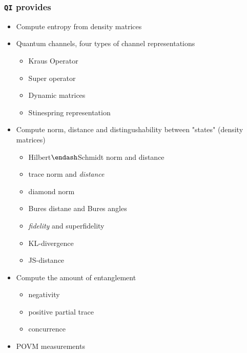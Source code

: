 \documentclass[11pt,a4paper]{article}
\begin{document}
\subsubsection{\texttt{QI} provides}
\begin{itemize}
\item Compute entropy from density matrices


\item Quantum channels, four types of channel representations

\begin{itemize}
\item Kraus Operator


\item Super operator


\item Dynamic matrices


\item Stinespring representation

\end{itemize}

\item Compute norm, distance and distingushability between "states" (density matrices)

\begin{itemize}
\item Hilbert\ensuremath{\endash}Schmidt norm and distance


\item trace norm and \emph{distance}


\item diamond norm


\item Bures distane and Bures angles


\item \emph{fidelity} and superfidelity


\item KL-divergence


\item JS-distance

\end{itemize}

\item Compute the amount of entanglement

\begin{itemize}
\item negativity


\item positive partial trace


\item concurrence

\end{itemize}

\item POVM measurements

\end{itemize}
\end{document}

